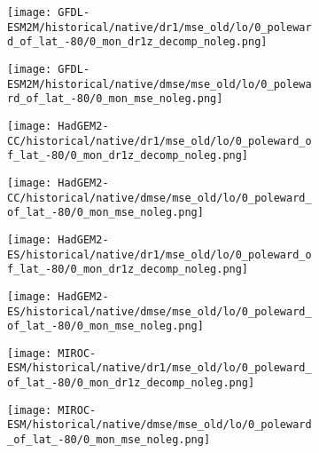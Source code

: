 \documentclass[preview]{standalone}
\begin{document}
\begin{figure}
  \begin{subfigure}[t]{0.5\textwidth}
    \texttt{[image: GFDL-ESM2M/historical/native/dr1/mse\_old/lo/0\_poleward\_of\_lat\_-80/0\_mon\_dr1z\_decomp\_noleg.png]}
  \end{subfigure}
  \begin{subfigure}[t]{0.5\textwidth}
    \texttt{[image: GFDL-ESM2M/historical/native/dmse/mse\_old/lo/0\_poleward\_of\_lat\_-80/0\_mon\_mse\_noleg.png]}
  \end{subfigure}
\end{figure}

\begin{figure}
  \begin{subfigure}[t]{0.5\textwidth}
    \texttt{[image: HadGEM2-CC/historical/native/dr1/mse\_old/lo/0\_poleward\_of\_lat\_-80/0\_mon\_dr1z\_decomp\_noleg.png]}
  \end{subfigure}
  \begin{subfigure}[t]{0.5\textwidth}
    \texttt{[image: HadGEM2-CC/historical/native/dmse/mse\_old/lo/0\_poleward\_of\_lat\_-80/0\_mon\_mse\_noleg.png]}
  \end{subfigure}
\end{figure}

\begin{figure}
  \begin{subfigure}[t]{0.5\textwidth}
    \texttt{[image: HadGEM2-ES/historical/native/dr1/mse\_old/lo/0\_poleward\_of\_lat\_-80/0\_mon\_dr1z\_decomp\_noleg.png]}
  \end{subfigure}
  \begin{subfigure}[t]{0.5\textwidth}
    \texttt{[image: HadGEM2-ES/historical/native/dmse/mse\_old/lo/0\_poleward\_of\_lat\_-80/0\_mon\_mse\_noleg.png]}
  \end{subfigure}
\end{figure}

\begin{figure}
  \begin{subfigure}[t]{0.5\textwidth}
    \texttt{[image: MIROC-ESM/historical/native/dr1/mse\_old/lo/0\_poleward\_of\_lat\_-80/0\_mon\_dr1z\_decomp\_noleg.png]}
  \end{subfigure}
  \begin{subfigure}[t]{0.5\textwidth}
    \texttt{[image: MIROC-ESM/historical/native/dmse/mse\_old/lo/0\_poleward\_of\_lat\_-80/0\_mon\_mse\_noleg.png]}
  \end{subfigure}
\end{figure}
\end{document}
